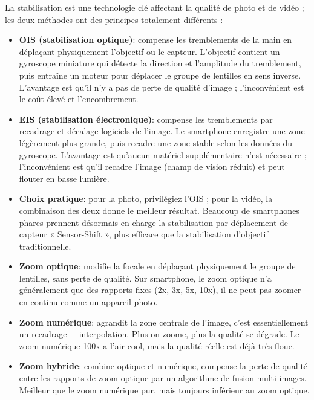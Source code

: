 
La stabilisation est une technologie clé affectant la qualité de photo et de vidéo ; les deux méthodes ont des principes totalement différents :

\begin{itemize}
  \item \textbf{OIS (stabilisation optique)}: compense les tremblements de la main en déplaçant physiquement l'objectif ou le capteur. L'objectif contient un gyroscope miniature qui détecte la direction et l'amplitude du tremblement, puis entraîne un moteur pour déplacer le groupe de lentilles en sens inverse. L'avantage est qu'il n'y a pas de perte de qualité d'image ; l'inconvénient est le coût élevé et l'encombrement.
  \item \textbf{EIS (stabilisation électronique)}: compense les tremblements par recadrage et décalage logiciels de l'image. Le smartphone enregistre une zone légèrement plus grande, puis recadre une zone stable selon les données du gyroscope. L'avantage est qu'aucun matériel supplémentaire n'est nécessaire ; l'inconvénient est qu'il recadre l'image (champ de vision réduit) et peut flouter en basse lumière.
  \item \textbf{Choix pratique}: pour la photo, privilégiez l'OIS ; pour la vidéo, la combinaison des deux donne le meilleur résultat. Beaucoup de smartphones phares prennent désormais en charge la stabilisation par déplacement de capteur « Sensor-Shift », plus efficace que la stabilisation d'objectif traditionnelle.
\end{itemize}


\begin{itemize}
  \item \textbf{Zoom optique}: modifie la focale en déplaçant physiquement le groupe de lentilles, sans perte de qualité. Sur smartphone, le zoom optique n'a généralement que des rapports fixes (2x, 3x, 5x, 10x), il ne peut pas zoomer en continu comme un appareil photo.
  \item \textbf{Zoom numérique}: agrandit la zone centrale de l'image, c'est essentiellement un recadrage + interpolation. Plus on zoome, plus la qualité se dégrade. Le zoom numérique 100x a l'air cool, mais la qualité réelle est déjà très floue.
  \item \textbf{Zoom hybride}: combine optique et numérique, compense la perte de qualité entre les rapports de zoom optique par un algorithme de fusion multi-images. Meilleur que le zoom numérique pur, mais toujours inférieur au zoom optique.
\end{itemize}

